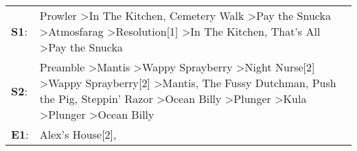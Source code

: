 \begin{supertabular}{p{0.03\textwidth}p{0.92\textwidth}}
 \textbf{S1}:  &                                                                                                                                                                                                                                               Prowler\textsuperscript{} \textgreater \enspace In The Kitchen\textsuperscript{}, \enspace Cemetery Walk\textsuperscript{} \textgreater \enspace Pay the Snucka\textsuperscript{} \textgreater \enspace Atmosfarag\textsuperscript{} \textgreater \enspace Resolution[1]\textsuperscript{} \textgreater \enspace In The Kitchen\textsuperscript{}, \enspace That's All\textsuperscript{} \textgreater \enspace Pay the Snucka\textsuperscript{}  \enspace  \\
 \textbf{S2}:  &  Preamble\textsuperscript{} \textgreater \enspace Mantis\textsuperscript{} \textgreater \enspace Wappy Sprayberry\textsuperscript{} \textgreater \enspace Night Nurse[2]\textsuperscript{} \textgreater \enspace Wappy Sprayberry[2]\textsuperscript{} \textgreater \enspace Mantis\textsuperscript{}, \enspace The Fussy Dutchman\textsuperscript{}, \enspace Push the Pig\textsuperscript{}, \enspace Steppin' Razor\textsuperscript{} \textgreater \enspace Ocean Billy\textsuperscript{} \textgreater \enspace Plunger\textsuperscript{} \textgreater \enspace Kula\textsuperscript{} \textgreater \enspace Plunger\textsuperscript{} \textgreater \enspace Ocean Billy\textsuperscript{}  \enspace  \\
 \textbf{E1}:  &                                                                                                                                                                                                                                                                                                                                                                                                                                                                                                                                                                                                                            Alex's House[2]\textsuperscript{}, \textsuperscript{}  \enspace  \\
\end{supertabular}
